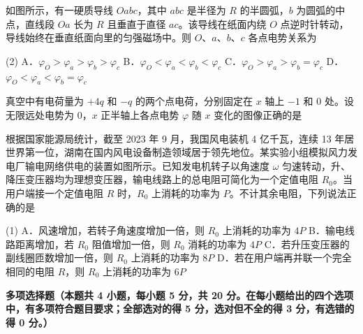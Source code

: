 \begin{question}
如图所示，有一硬质导线 $Oabc$，其中 $abc$ 是半径为 $R$ 的半圆弧，$b$ 为圆弧的中点，直线段 $Oa$ 长为 $R$ 且垂直于直径 $ac$。该导线在纸面内绕 $O$ 点逆时针转动，导线始终在垂直纸面向里的匀强磁场中。则 $O$、$a$、$b$、$c$ 各点电势关系为\gkblank


\begin{gkopts}(2)
  \task A．$\varphi_O>\varphi_a>\varphi_b>\varphi_c$
  \task B．$\varphi_O<\varphi_a<\varphi_b<\varphi_c$
  \task C．$\varphi_O>\varphi_a>\varphi_b=\varphi_c$
  \task D．$\varphi_O<\varphi_a<\varphi_b=\varphi_c$
\end{gkopts}
\end{question}

\begin{question}
真空中有电荷量为 $+4q$ 和 $-q$ 的两个点电荷，分别固定在 $x$ 轴上 $-1$ 和 0 处。设无限远处电势为 0，$x$ 正半轴上各点电势 $\varphi$ 随 $x$ 变化的图像正确的是\gkblank

\end{question}

\begin{question}
根据国家能源局统计，截至 2023 年 9 月，我国风电装机 4 亿千瓦，连续 13 年居世界第一位，湖南在国内风电设备制造领域居于领先地位。某实验小组模拟风力发电厂输电网络供电的装置如图所示。已知发电机转子以角速度 $\omega$ 匀速转动，升、降压变压器均为理想变压器，输电线路上的总电阻可简化为一个定值电阻 $R_{0}$。当用户端接一个定值电阻 $R$ 时，$R_{0}$ 上消耗的功率为 $P$。不计其余电阻，下列说法正确的是\gkblank


\begin{gkopts}(1)
  \task A．风速增加，若转子角速度增加一倍，则 $R_{0}$ 上消耗的功率为 $4P$
  \task B．输电线路距离增加，若 $R_{0}$ 阻值增加一倍，则 $R_{0}$ 消耗的功率为 $4P$
  \task C．若升压变压器的副线圈匝数增加一倍，则 $R_{0}$ 上消耗的功率为 $8P$
  \task D．若在用户端再并联一个完全相同的电阻 $R$，则 $R_{0}$ 上消耗的功率为 $6P$
\end{gkopts}
\end{question}


\textbf{多项选择题（本题共 4 小题，每小题 5 分，共 20 分。在每小题给出的四个选项中，有多项符合题目要求；全部选对的得 5 分，选对但不全的得 3 分，有选错的得 0 分。）}

